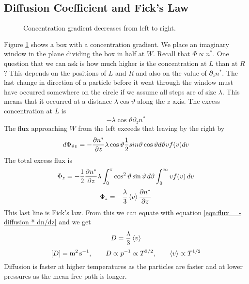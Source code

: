 \documentclass{article}
\begin{document}
    \subsection{Diffusion Coefficient and Fick's Law}
    \begin{figure}[ht]
        \centering
        \caption{Concentration gradient decreases from left to right.}
        \label{fig:window}
    \end{figure}
    Figure \ref{fig:window} shows a box with a concentration gradient.
    We place an imaginary window in the plane dividing the box in half at \(W\).
    Recall that \(\Phi\propto n^*\).
    One question that we can ask is how much higher is the concentration at \(L\) than at \(R\)?
    This depends on the positions of \(L\) and \(R\) and also on the value of \(\partial_z n^*\).
    The last change in direction of a particle before it went through the window must have occurred somewhere on the circle if we assume all steps are of size \(\lambda\).
    This means that it occurred at a distance \(\lambda\cos\vartheta\) along the \(z\) axis.
    The excess concentration at \(L\) is
    \[-\lambda\cos\vartheta\partial_z n^*\]
    The flux approaching \(W\) from the left exceeds that leaving by the right by
    \[d\Phi_{\vartheta v} = -\pdv{n^*}{z}\lambda\cos\vartheta\frac{1}{2}sin\vartheta\cos\vartheta d\vartheta vf(v)dv\]
    The total excess flux is
    \[\Phi_z = -\frac{1}{2}\pdv{n^*}{z}\lambda\int_0^\pi \cos^2\vartheta\sin\vartheta\,d\vartheta\int_0^\infty vf(v)\,dv\]
    \[\Phi_z = -\frac{\lambda}{3}\expected{v}\pdv{n^*}{z}\]
    This last line is Fick's law.
    From this we can equate with equation \ref{eqn:flux = -diffusion * dn/dz} and we get
    \[D = \frac{\lambda}{3}\expected{v}\]
    \[[D] = \si{m^2.s^{-1}},\qquad D\propto p^{-1} \propto T^{3/2},\qquad \expected{v} \propto T^{1/2}\]
    Diffusion is faster at higher temperatures as the particles are faster and at lower pressures as the mean free path is longer.
    
\end{document}
